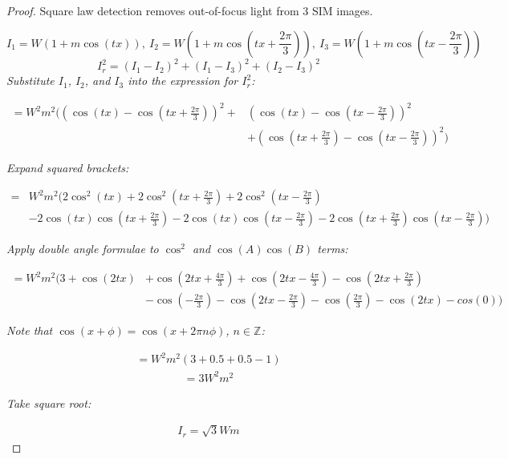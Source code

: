 \begin{proof}
\caption{Square law detection removes out-of-focus light from 3 SIM images.}\label{pro:square}

\begin{equation*}
I_1 = W(1+m\cos(tx)),~I_2 = W(1+m\cos(tx+\frac{2\pi}{3})),~I_3 = W(1+m\cos(tx-\frac{2\pi}{3}))
\end{equation*}
\begin{equation*}
I_r^2 = (I_1 - I_2)^2 + (I_1 - I_3)^2 + (I_2 - I_3)^2
\end{equation*}
\textit{Substitute $I_1$, $I_2$, and $I_3$ into the expression for $I_r^2$:}

\begin{align*}
=W^2m^2\Bigg(\left(\cos(tx)-\cos(tx+\frac{2\pi}{3})\right)^2+&\left(\cos(tx)-\cos(tx-\frac{2\pi}{3})\right)^2\\&+\left(\cos(tx+\frac{2\pi}{3})-\cos(tx-\frac{2\pi}{3})\right)^2\Bigg)
\end{align*}

\textit{Expand squared brackets:}

\begin{align*}
=& W^2m^2\Big(2\cos^2(tx) + 2\cos^2(tx+\frac{2\pi}{3}) + 2\cos^2(tx-\frac{2\pi}{3})
 \\& - 2\cos(tx)\cos(tx+\frac{2\pi}{3}) - 2\cos(tx)\cos(tx-\frac{2\pi}{3}) - 2\cos(tx+\frac{2\pi}{3})\cos(tx-\frac{2\pi}{3})\Big)
\end{align*}

\textit{Apply double angle formulae to $\cos^2$ and $\cos(A)\cos(B)$ terms:}

\begin{align*}
= W^2m^2\Big(3 + \cos(2tx) &+ \cos(2tx+\frac{4\pi}{3}) + \cos(2tx-\frac{4\pi}{3})
- \cos(2tx+\frac{2\pi}{3}) \\&- \cos(-\frac{2\pi}{3}) - \cos(2tx-\frac{2\pi}{3}) - \cos(\frac{2\pi}{3}) -\cos(2tx) - cos(0)\Big)
\end{align*}

\textit{Note that $\cos(x+\phi) = \cos(x+2\pi n\phi)$, $n\in \mathbb{Z}$:}

\begin{align*}
= W^2m^2(3 + 0.5 + 0.5 - 1)
\end{align*}
\begin{align*}
= 3W^2m^2
\end{align*}

\textit{Take square root:}

\begin{align*}
I_r = \sqrt3Wm
\end{align*}

\end{proof}

